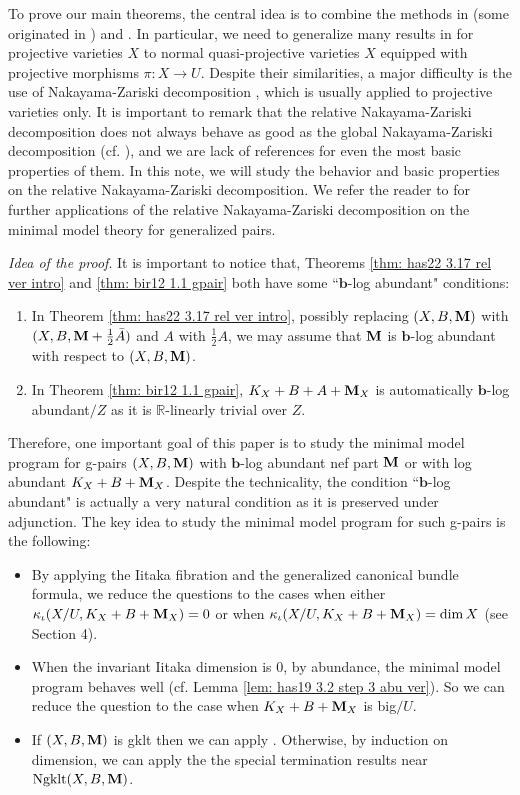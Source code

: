 \documentclass[11pt]{amsart}
\numberwithin{equation}{section}
\newcommand{\bb}{\bm{b}}
\newcommand{\Mm}{{\bf{M}}}
\newcommand{\Rr}{\mathbb{R}}
\newcommand{\Ngklt}{\operatorname{Ngklt}}
\theoremstyle{definition}
\theoremstyle{definition}
\theoremstyle{definition}
\begin{document}
\medskip



To prove our main theorems, the central idea is to combine the methods in \cite{Has22} (some originated in \cite{Has20a,Has20b,HH20}) and \cite{HL21}. In particular, we need to generalize many results in \cite{Has22} for projective varieties $X$ to normal quasi-projective varieties $X$ equipped with projective morphisms $\pi: X\rightarrow U$. Despite their similarities, a major difficulty is the use of Nakayama-Zariski decomposition \cite[III. \S 1]{Nak04}, which is usually applied to projective varieties only. It is important to remark that the relative Nakayama-Zariski decomposition \cite[III. \S 4]{Nak04} does not always behave as good as the global Nakayama-Zariski decomposition (cf. \cite{Les16}), and we are lack of references for even the most basic properties of them. In this note, we will study the behavior and basic properties on the relative Nakayama-Zariski decomposition. We refer the reader to \cite{LT21} for further applications of the relative Nakayama-Zariski decomposition on the minimal model theory for generalized pairs.

\medskip

\noindent\textit{Idea of the proof}. It is important to notice that, Theorems \ref{thm: has22 3.17 rel ver intro} and \ref{thm: bir12 1.1 gpair} both have some ``$\bb$-log abundant" conditions:
\begin{enumerate}
    \item In Theorem \ref{thm: has22 3.17 rel ver intro}, possibly replacing $(X,B,\Mm)$ with $(X,B,\Mm+\frac{1}{2}\bar A)$ and $A$ with $\frac{1}{2}A$, we may assume that $\Mm$ is $\bb$-log abundant with respect to $(X,B,\Mm)$.
    \item In Theorem \ref{thm: bir12 1.1 gpair}, $K_X+B+A+\Mm_X$ is automatically $\bb$-log abundant$/Z$ as it is $\Rr$-linearly trivial over $Z$.
\end{enumerate}
Therefore, one important goal of this paper is to study the minimal model program for g-pairs $(X,B,\Mm)$ with $\bb$-log abundant nef part $\Mm$ or with log abundant $K_X+B+\Mm_X$. Despite the technicality, the condition ``$\bb$-log abundant" is actually a very natural condition as it is preserved under adjunction. The key idea to study the minimal model program for such g-pairs is the following:
\begin{itemize}
    \item By applying the Iitaka fibration and the generalized canonical bundle formula, we reduce the questions to the cases when either $\kappa_{\iota}(X/U,K_X+B+\Mm_X)=0$ or when $\kappa_{\iota}(X/U,K_X+B+\Mm_X)=\dim X$ (see Section 4).
    \item When the invariant Iitaka dimension is $0$, by abundance, the minimal model program behaves well (cf. Lemma \ref{lem: has19 3.2 step 3 abu ver}). So we can reduce the question to the case when $K_X+B+\Mm_X$ is big$/U$.
    \item If $(X,B,\Mm)$ is gklt then we can apply \cite[Lemma 4.4(2)]{BZ16}. Otherwise, by induction on dimension, we can apply the the special termination results near $\Ngklt(X,B,\Mm)$.
\end{itemize}
\end{document}
